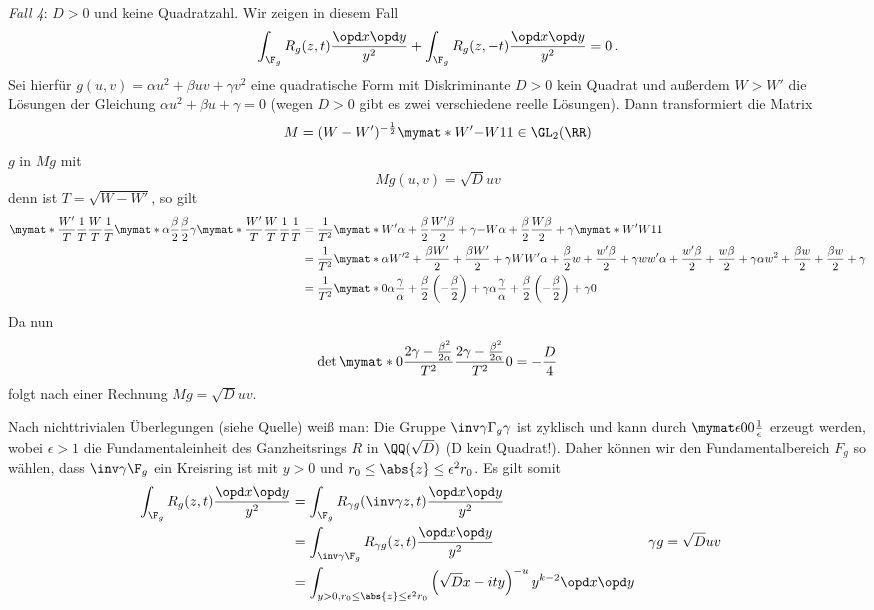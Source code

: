 \emph{Fall 4}: $D > 0$ und keine Quadratzahl. Wir zeigen in diesem Fall
\[
	\int_{\F_g} R_g (z, t) \frac {\opd x \opd y}{y^2} + \int_{\F_g} R_g (z, -t) \frac {\opd x \opd y}{y^2} = 0
	\,.
\]
Sei hierfür $g(u, v) = \alpha u^2 + \beta uv + \gamma v^2$ eine quadratische Form mit Diskriminante $D > 0$ kein Quadrat und außerdem $W > W'$ die Lösungen der Gleichung $\alpha u^2 + \beta u + \gamma = 0$ (wegen $D > 0$ gibt es zwei verschiedene reelle Lösungen). Dann transformiert die Matrix
\[
	M = (W - W')^{- \frac 12} \mymat*{W'}{-W}11 \in \GL_2(\RR)
\]
$g$ in $Mg$ mit
\[
	M g(u, v) = \sqrt{D} uv
\]
denn ist $T = \sqrt{W-W'}$, so gilt
\begin{align*}
	\mymat*{\frac {W'}T}{\frac 1T}{\frac WT}{\frac 1T} \mymat*{\alpha}{\frac \beta 2}{\frac \beta 2}{\gamma} \mymat*{\frac {W'}T}{\frac WT}{\frac 1T}{\frac 1T} 
	&= \frac{1}{T^2} \mymat*{W' \alpha + \frac \beta 2}{\frac {W' \beta}2 + \gamma}{- W \alpha + \frac \beta 2}{\frac {W \beta}2 + \gamma} \mymat*{W'}W11 \\
	&= \frac{1}{T^2} \mymat*{\alpha W'^2 + \frac {\beta W'}2 + \frac {\beta W'}2 + \gamma}{WW'\alpha + \frac \beta 2 w + \frac {w' \beta}2 + \gamma}{ww'\alpha + \frac {w'\beta}2 + \frac {w\beta}2 + \gamma}{\alpha w^2 + \frac {\beta w}2 + \frac {\beta w}2 + \gamma} \\
	&= \frac{1}{T^2} \mymat* 0{\alpha \frac \gamma \alpha + \frac \beta 2 \left( - \frac \beta 2 \right) + \gamma}{\alpha \frac \gamma \alpha + \frac \beta 2 \left( - \frac \beta 2 \right) + \gamma}0
\end{align*}
Da nun 
\[
	\det \mymat* 0 {\frac {2\gamma - \frac {\beta^2}{2 \alpha}}{T^2}} {\frac {2\gamma - \frac {\beta^2}{2 \alpha}}{T^2}} 0 = - \frac D4
\]
folgt nach einer Rechnung $Mg = \sqrt{D} uv$.

Nach nichttrivialen Überlegungen (siehe Quelle) weiß man: Die Gruppe $\inv \gamma \Gamma_g \gamma$ ist zyklisch und kann durch $\mymat \epsilon 0 0 {\frac 1 \epsilon}$ erzeugt werden, wobei $\epsilon > 1$ die Fundamentaleinheit des Ganzheitsrings $R$ in $\QQ(\sqrt{D})$ (D kein Quadrat!). Daher können wir den Fundamentalbereich $F_g$ so wählen, dass $\inv \gamma \F_g$ ein Kreisring ist mit $y > 0$ und $r_0 \leq \abs{z} \leq \epsilon^2 r_0$. Es gilt somit
\begin{align*}
	\int_{\F_g} R_g (z, t) \frac {\opd x \opd y}{y^2} 
	&= \int_{\F_g} R_{\gamma g} (\inv \gamma z, t) \frac {\opd x \opd y}{y^2} \\
	&= \int_{\inv \gamma \F_g} R_{\gamma g} (z, t) \frac {\opd x \opd y}{y^2} && \gamma g = \sqrt{D} uv \\
	&= \int_{y > 0, r_0 \leq \abs{z} \leq \epsilon^2 r_0} \left( \sqrt{D}x - ity \right)^{-u} y^{k-2} \opd x \opd y
\end{align*}

